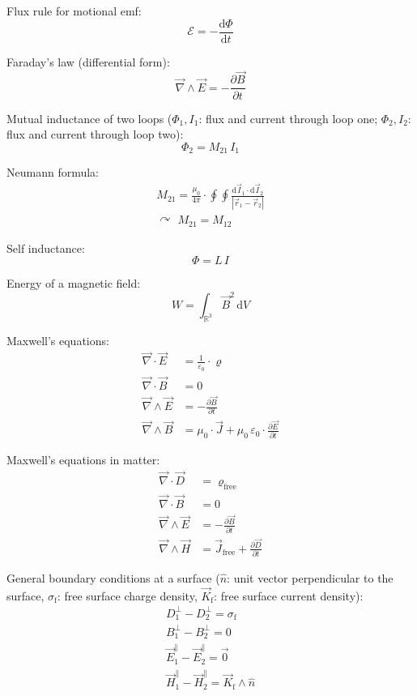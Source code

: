 \documentclass[fontsize=11pt,a4paper]{scrartcl}
\begin{document}
Flux rule for motional emf:
\[
	\mathcal{E}=-\frac{\mathrm{d}\Phi}{\mathrm{d}t}
\]

Faraday's law (differential form):
\[
	\vec\nabla\wedge\vec E=-\frac{\partial\vec B}{\partial t}
\]

Mutual inductance of two loops ($\Phi_1, I_1$: flux and current through loop one; $\Phi_2, I_2$: flux and current through loop two):
\[
	\Phi_2=M_{21}\,I_1
\]

Neumann formula:
\begin{gather*}
	M_{21}=\frac{\mu_0}{4\pi}\cdot\oint\oint\frac{\mathrm{d}\vec I_1\cdot\mathrm{d}\vec I_2}{|\vec r_1-\vec r_2|}\\
	\curvearrowright\,\,M_{21}=M_{12}
\end{gather*}

Self inductance:
\[
	\Phi=L\,I
\]

Energy of a magnetic field:
\[
	W=\int_{\mathbb{R}^3}\vec B^2\,\mathrm{d}V
\]

Maxwell's equations:
\begin{align*}
	\vec\nabla\cdot\vec E&=\frac{1}{\varepsilon_0}\cdot\varrho\\
	\vec\nabla\cdot\vec B&=0\\
	\vec\nabla\wedge\vec E&=-\frac{\partial\vec B}{\partial t}\\
	\vec\nabla\wedge\vec B&=\mu_0\cdot\vec J+\mu_0\,\varepsilon_0\cdot\frac{\partial\vec E}{\partial t}
\end{align*}

Maxwell's equations in matter:
\begin{align*}
	\vec\nabla\cdot\vec D&=\varrho_\mathrm{free}\\
	\vec\nabla\cdot\vec B&=0\\
	\vec\nabla\wedge\vec E&=-\frac{\partial\vec B}{\partial t}\\
	\vec\nabla\wedge\vec H&=\vec J_\mathrm{free}+\frac{\partial\vec D}{\partial t}
\end{align*}

General boundary conditions at a surface ($\hat n$: unit vector perpendicular to the surface, $\sigma_\mathrm{f}$: free surface charge density, $\vec K_\mathrm{f}$: free surface current density):
\begin{gather*}
	D_1^\perp-D_2^\perp=\sigma_\mathrm{f}\\
	B_1^\perp-B_2^\perp=0\\
	\vec E_1^\parallel-\vec E_2^\parallel=\vec 0\\
	\vec H_1^\parallel-\vec H_2^\parallel=\vec K_\mathrm{f}\wedge\hat n
\end{gather*}
\end{document}

